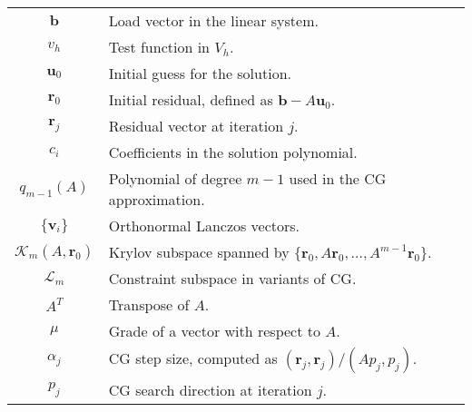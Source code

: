 \begin{longtable}{c p{10cm}}
    $\mathbf{b}$                    & Load vector in the linear system.                                                                             \\
    $v_h$                           & Test function in $V_h$.                                                                                       \\
    $\mathbf{u}_0$                  & Initial guess for the solution.                                                                               \\
    $\mathbf{r}_0$                  & Initial residual, defined as $\mathbf{b} - A\mathbf{u}_0$.                                                    \\
    $\mathbf{r}_j$                  & Residual vector at iteration $j$.                                                                             \\
    $c_i$                           & Coefficients in the solution polynomial.                                                                      \\
    $q_{m-1}(A)$                    & Polynomial of degree $m-1$ used in the CG approximation.                                                      \\
    $\{\mathbf{v}_i\}$              & Orthonormal Lanczos vectors.                                                                                  \\
    $\mathcal{K}_m(A,\mathbf{r}_0)$ & Krylov subspace spanned by $\{\mathbf{r}_0, A\mathbf{r}_0, \dots, A^{m-1}\mathbf{r}_0\}$.                     \\
    $\mathcal{L}_m$                 & Constraint subspace in variants of CG.                                                                        \\
    $A^T$                           & Transpose of $A$.                                                                                             \\
    $\mu$                           & Grade of a vector with respect to $A$.                                                                        \\
    $\alpha_j$                      & CG step size, computed as $(\mathbf{r}_j, \mathbf{r}_j)/(A p_j, p_j)$.                                        \\
    $p_j$                           & CG search direction at iteration $j$.                                                                         \\

\end{longtable}

